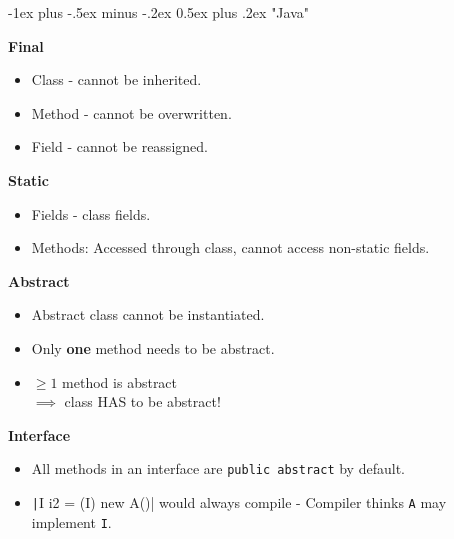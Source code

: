 \documentclass[10pt, landscape]{article}
\makeatletter
\renewcommand{\section}{\@startsection{section}{1}{0mm}%
                                {-1ex plus -.5ex minus -.2ex}%
                                {0.5ex plus .2ex}%
                                {\normalfont\large\bfseries}}
\newcommand{\code}[1]{\textcolor{mygreen}{\texttt{#1}}}
\newcommand{\java}[1]{\texttt|#1|}
\makeatother
\begin{document}
\raggedright
\footnotesize
\begin{multicols}{2}

\setlength{\columnseprule}{0.25pt} %
\setlength{\premulticols}{1pt}
\setlength{\postmulticols}{1pt}
\setlength{\multicolsep}{1pt}
\setlength{\columnsep}{2pt}

\begin{center}
\end{center}

\section{"Java"}
\begin{multicols}{2}

\textbf{Final}
\begin{itemize}
    \item Class - cannot be inherited.
    \item Method - cannot be overwritten.
    \item Field - cannot be reassigned.
\end{itemize}

\textbf{Static}
\begin{itemize}
    \item Fields - class fields.
    \item Methods: Accessed through class, cannot access non-static fields. 
\end{itemize}

\columnbreak{}

\textbf{Abstract}
\begin{itemize}
    \item Abstract class cannot be instantiated.
    \item Only \textbf{one} method needs to be abstract. 
    \item $\geq 1$ method is abstract \\ $\implies$ class HAS to be abstract!
\end{itemize}

\textbf{Interface}
\begin{itemize}
    \item All methods in an interface are \code{public abstract} by default.
    \item \java{I i2 = (I) new A()} would always compile - Compiler thinks \code{A} may implement \code{I}. 
\end{itemize} 
\end{multicols}


\end{multicols}
\end{document}
